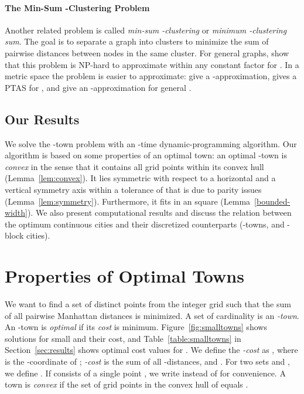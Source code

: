\documentclass[preprint,authoryear,12pt]{elsarticle}
\begin{document}
\paragraph{The Min-Sum -Clustering Problem}
Another related problem is called \emph{min-sum -clustering} or
\emph{minimum -clustering sum}. The goal is to separate a graph
into  clusters to minimize the sum of pairwise distances between
nodes in the same cluster.  For general graphs,
\cite{sahni76} show that this problem is NP-hard to approximate
within any constant factor for . In a metric space the
problem is easier to approximate:
\cite{guttmannbeck98} give a -approximation,
\cite{indyk99} gives a PTAS for , and
\cite{bartal01} give an
-approximation for general .


\subsection{Our Results} We solve the -town problem with an
-time dynamic-programming algorithm.
Our algorithm is based on some properties of an optimal town:
an optimal -town is \emph{convex} in the sense that it contains
all grid points within its convex hull (Lemma~\ref{lem:convex}).
It lies symmetric with respect to a horizontal and a vertical
symmetry axis within a tolerance of  that is due to parity
issues
 (Lemma~\ref{lem:symmetry}).
Furthermore, it fits in an  square
 (Lemma~\ref{bounded-width}).
 We also present
computational results and discuss the relation between
the optimum continuous cities and their discretized counterparts
(-towns, and -block cities).




\section{Properties of Optimal Towns}\label{sec:prelim}
We want to find a set of  distinct points from the integer grid
 such that the sum of all pairwise
Manhattan distances is minimized. A set  of cardinality  is an \emph{-town}. An -town
 is \emph{optimal} if its \emph{cost} 
is minimum.
Figure~\ref{fig:smalltowns} shows solutions for small  and their
cost, and Table~\ref{table:smalltowns} in Section~\ref{sec:results}
 shows optimal cost values
 for .
 We define the \emph{-cost}  as
, where  is the
-coordinate of ; \emph{-cost}  is the sum of all
-distances, and . For two
sets  and , we define . If  consists of a single point , we write
 instead of  for convenience. A town  is
\emph{convex} if the set of grid points in the convex hull of 
equals .
\end{document}
